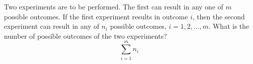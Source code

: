 \item Two experiments are to be performed. The first can result in any one of $m$ possible outcomes. If the first experiment results in outcome $i$, then the second experiment can result in any of $n_i$ possible outcomes, $i = 1,2,\dots,m$. What is the number of possible outcomes of the two experiments?
\[ \sum_{i=1}^m n_i \]